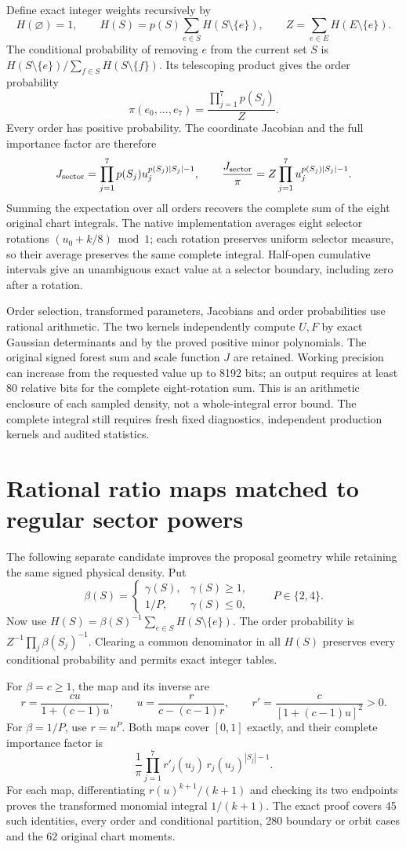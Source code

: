 \documentclass[11pt]{article}
\begin{document}
Define exact integer weights recursively by
\[
 H(\varnothing)=1,\qquad
 H(S)=p(S)\sum_{e\in S}H(S\setminus\{e\}),\qquad
 Z=\sum_{e\in E}H(E\setminus\{e\}).
\]
The conditional probability of removing $e$ from the current set $S$ is
$H(S\setminus\{e\})/\sum_{f\in S}H(S\setminus\{f\})$.
Its telescoping product gives the order probability
\[
 \pi(e_0,\ldots,e_7)=\frac{\prod_{j=1}^{7}p(S_j)}Z.
\]
Every order has positive probability. The coordinate Jacobian and the
full importance factor are therefore
\[
 J_{\rm sector}=\prod_{j=1}^{7}p(S_j)u_j^{p(S_j)|S_j|-1},\qquad
 \frac{J_{\rm sector}}\pi
       =Z\prod_{j=1}^{7}u_j^{p(S_j)|S_j|-1}.
\]
Summing the expectation over all orders recovers the complete sum of the
eight original chart integrals. The native implementation averages eight
selector rotations $(u_0+k/8)\bmod1$; each rotation preserves uniform
selector measure, so their average preserves the same complete integral.
Half-open cumulative intervals give an unambiguous exact value at a
selector boundary, including zero after a rotation.

Order selection, transformed parameters, Jacobians and order probabilities
use rational arithmetic. The two kernels independently compute $U,F$ by
exact Gaussian determinants and by the proved positive minor polynomials.
The original signed forest sum and scale function $J$ are retained.
Working precision can increase from the requested value up to 8192 bits;
an output requires at least 80 relative bits for the complete eight-rotation
sum. This is an arithmetic enclosure of each sampled density, not a
whole-integral error bound. The complete integral still requires fresh
fixed diagnostics, independent production kernels and audited statistics.
\section*{Rational ratio maps matched to regular sector powers}
The following separate candidate improves the proposal geometry while
retaining the same signed physical density. Put
\[
 \beta(S)=\begin{cases}\gamma(S),&\gamma(S)\geq1,\\
 1/P,&\gamma(S)\leq0,\end{cases}\qquad P\in\{2,4\}.
\]
Now use $H(S)=\beta(S)^{-1}\sum_{e\in S}H(S\setminus\{e\})$.
The order probability is $Z^{-1}\prod_j\beta(S_j)^{-1}$.
Clearing a common denominator in all $H(S)$ preserves every conditional
probability and permits exact integer tables.

For $\beta=c\geq1$, the map and its inverse are
\[
 r=\frac{cu}{1+(c-1)u},\qquad
 u=\frac r{c-(c-1)r},\qquad
 r'=\frac c{[1+(c-1)u]^2}>0.
\]
For $\beta=1/P$, use $r=u^P$.
Both maps cover $[0,1]$ exactly, and their complete importance factor is
\[
 \frac1\pi\prod_{j=1}^7r'_j(u_j)\,r_j(u_j)^{|S_j|-1}.
\]
For each map, differentiating $r(u)^{k+1}/(k+1)$ and checking its two
endpoints proves the transformed monomial integral $1/(k+1)$.
The exact proof covers 45 such identities, every order and conditional
partition, 280 boundary or orbit cases and the 62 original chart moments.
\end{document}
